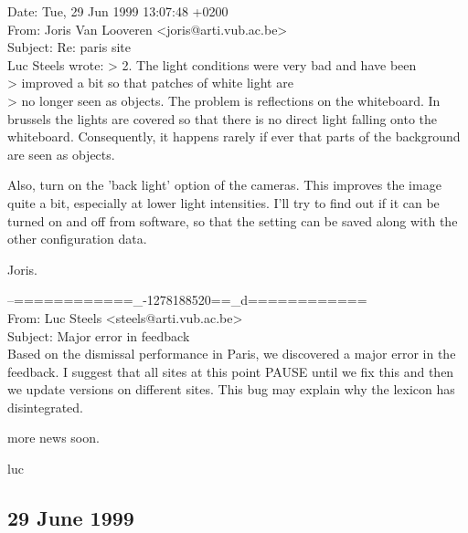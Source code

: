\begin{mail}
Date: Tue, 29 Jun 1999 13:07:48 +0200\\
From: Joris Van Looveren <joris@arti.vub.ac.be>\\
Subject: Re: paris site\\

Luc Steels wrote:
> 2. The light conditions were very bad and have been
\\> improved a bit so that patches of white light are
\\> no longer seen as objects.
The problem is reflections on the whiteboard. In brussels the lights are
covered so that there is no direct light falling onto the whiteboard.
Consequently, it happens rarely if ever that parts of the background are
seen as objects.

Also, turn on the 'back light' option of the cameras. This improves the
image quite a bit, especially at lower light intensities. I'll try to
find out if it can be turned on and off from software, so that the
setting can be saved along with the other configuration data.

Joris.
\end{mail}

\begin{mail}
--============\_-1278188520==\_d============\\
From: Luc Steels <steels@arti.vub.ac.be>\\
Subject: Major error in feedback \\

Based on the dismissal performance in Paris, we
discovered a major error in the feedback. I
suggest that all sites at this point PAUSE until
we fix this and then we update versions on
different sites. This bug may explain why
the lexicon has disintegrated.

more news soon.

luc
\end{mail}

\subsection*{29 June 1999} 


